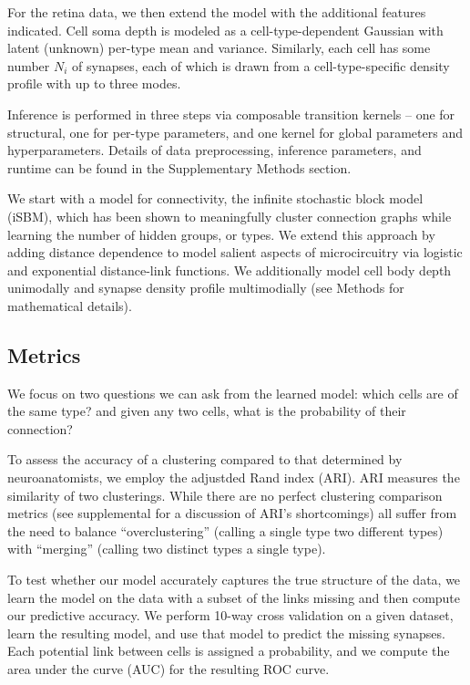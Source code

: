 \documentclass{article}
\begin{document}
For the retina data, we then extend the model with the additional
features indicated. Cell soma depth is modeled as a
cell-type-dependent Gaussian with latent (unknown) per-type mean and
variance. Similarly, each cell has some number $N_i$ of synapses, 
each of which is drawn from a cell-type-specific density profile
with up to three modes.

Inference is performed in three steps via composable transition 
kernels -- one for structural, one for per-type parameters, and
one kernel for global parameters and hyperparameters. Details
of data preprocessing, inference parameters, and runtime can
be found in the Supplementary Methods section. 


We start with a model for connectivity, the infinite stochastic block
model (iSBM)\autocite{Kemp2006a,Xu2006}, which has been shown to
meaningfully cluster connection graphs while learning the number of
hidden groups, or types. We extend this approach by adding distance
dependence to model salient aspects of microcircuitry via logistic and
exponential distance-link functions.  We additionally model cell body
depth unimodally and synapse density profile multimodially (see
Methods for mathematical details).


\subsection{Metrics}
We focus on two questions we can ask from the learned model: which
cells are of the same type? and given any two cells, what is the
probability of their connection? 

To assess the accuracy of a clustering compared to that determined by
neuroanatomists, we employ the adjustded Rand index (ARI). ARI
measures the similarity of two clusterings. While there are no perfect
clustering comparison metrics (see supplemental for a discussion of
ARI's shortcomings) all suffer from the need to balance
``overclustering'' (calling a single type two different types) with
``merging'' (calling two distinct types a single type).

To test whether our model accurately captures the true structure of
the data, we learn the model on the data with a subset of the links
missing and then compute our predictive accuracy. We perform 10-way
cross validation on a given dataset, learn the resulting model, and
use that model to predict the missing synapses. Each potential
link between cells is assigned a probability, and we compute
the area under the curve (AUC) for the resulting ROC curve. 
\end{document}
